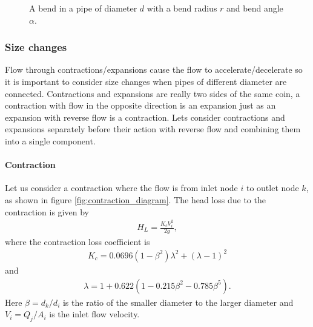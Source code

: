 \documentclass[12pt]{article}
\begin{document}
\begin{figure}
\centering
{} 
\caption{A bend in a pipe of diameter $d$ with a bend radius $r$ and bend angle $\alpha$.}
\label{fig:bend_diagram}
\end{figure}

\subsubsection{Size changes}

Flow through contractions/expansions cause the flow to accelerate/decelerate so it is important to consider size changes when pipes of different diameter are connected. Contractions and expansions are really two sides of the same coin, a contraction with flow in the opposite direction is an expansion just as an expansion with reverse flow is a contraction. Lets consider contractions and expansions separately before their action with reverse flow and combining them into a single component.  

\paragraph{Contraction}

Let us consider a contraction where the flow is from inlet node $i$ to outlet node $k$, as shown in figure \ref{fig:contraction_diagram}. The head loss due to the contraction \cite{rennels22} is given by
\begin{align}
H_L = \frac{K_c V_i^2}{2g},
\end{align}
where the contraction loss coefficient is
\begin{align*}
K_c = 0.0696 \left( 1 - \beta^2 \right) \lambda^2 + \left( \lambda - 1 \right)^2
\end{align*}
and
\begin{align*}
\lambda = 1 + 0.622 \left( 1 - 0.215 \beta^2 - 0.785 \beta^5 \right).
\end{align*}
Here $\beta = d_k / d_i$ is the ratio of the smaller diameter to the larger diameter and $V_i = Q_j / A_i$ is the inlet flow velocity. 
\end{document}
